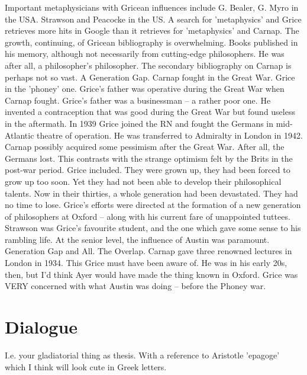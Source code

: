 \documentclass[10pt,titlepage]{book}
\begin{document}
{Important metaphysicians  with Gricean influences include G. Bealer, G. Myro 
in the USA. Strawson and  Peacocke in the US. A search for 'metaphysics' 
and Grice retrieves more hits in  Google than it retrieves for 'metaphysics' 
and Carnap. The growth, continuing,  of Gricean bibliography is overwhelming. 
Books published in his memory, although  not necessarily from cutting-edge 
philosophers. He was after all, a  philosopher's philosopher. The secondary 
bibliography on Carnap is perhaps not  so vast. 
A  Generation Gap. Carnap fought in the Great War. Grice in the 'phoney' 
one.  Grice's father was operative during the Great War when Carnap fought. 
Grice's  father was a businessman -- a rather poor one. He invented a 
contraception that  was good during the Great War but found useless in the 
aftermath. In 1939 Grice  joined the RN and fought the Germans in mid-Atlantic 
theatre of operation. He  was transferred to Admiralty in London in 1942. Carnap 
possibly acquired some  pessimism after the Great War. After all, the Germans 
lost. This contrasts  with the strange optimism felt by the Brits in the 
post-war period. Grice  included. They were grown up, they had been forced to 
grow up too soon. Yet they  had not been able to develop their philosophical 
talents. Now in their thirties,  a whole generation had been devastated. 
They had no time to lose. Grice's  efforts were directed at the formation of a 
new generation of philosophers at  Oxford -- along with his current fare of 
unappointed tuttees. Strawson was  Grice's favourite student, and the one 
which gave some sense to his rambling  life. At the senior level, the 
influence of Austin was  paramount. 
Generation  Gap and All. The Overlap. Carnap gave three renowned lectures 
in London in 1934. This  Grice must have been aware of. He was in his early 
20s, then, but I’d think Ayer  would have made the thing known in Oxford. 
Grice was VERY  concerned with  what Austin was doing -- before the Phoney war.



\section{Dialogue}

I.e. your gladiatorial thing as thesis.
With a reference to Aristotle 'epagoge' which I think will look cute in Greek letters.
 
}
\end{document}
